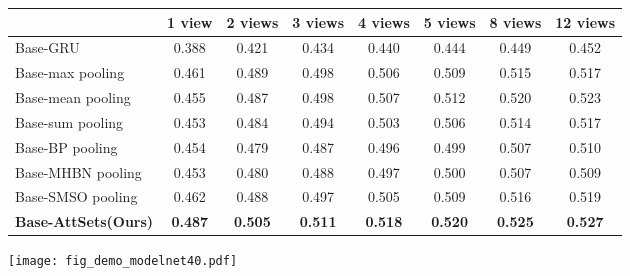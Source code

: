 \documentclass[twocolumn]{svjour3}    \pdfoutput=1
\newcommand{\nickname}{AttSets}
\newcommand{\ie}{\textit{i}.\textit{e}., }
\begin{document}
\begin{table*}[t]
\caption{Group 2: mean IoU for multi-view reconstruction of all 40 categories in ModelNet40 testing split. All networks are firstly trained given only 1 image for each object in Stage 1. The \nickname{} module is further trained given random number of images per object in Stage 2, \ie  is uniformly sampled from \textbf{[1, 12]}, while other competing approaches are fine-tuned given random number of views per object in Stage 2.}
\centering
\label{tab:iou_modelnet_allv}
\tabcolsep=0.4cm
\begin{tabular}{ l|ccccccc}
\hline
&1 view&2 views&3 views& 4 views&5 views&8 views&12 views \\
\hline
Base-GRU &0.388&0.421&0.434&0.440&0.444&0.449&0.452\\
Base-max pooling &0.461&0.489&0.498&0.506&0.509&0.515&0.517\\
Base-mean pooling &0.455&0.487&0.498&0.507&0.512&0.520&0.523\\
Base-sum pooling &0.453&0.484&0.494&0.503&0.506&0.514&0.517\\
Base-BP pooling &0.454&0.479&0.487&0.496&0.499&0.507&0.510\\
Base-MHBN pooling &0.453&0.480&0.488&0.497&0.500&0.507&0.509\\
Base-SMSO pooling &0.462&0.488&0.497&0.505&0.509&0.516&0.519\\
\textbf{Base-\nickname{}(Ours)} &\textbf{0.487}&\textbf{0.505}&\textbf{0.511}&\textbf{0.518}&\textbf{0.520}&\textbf{0.525}
&\textbf{0.527} \\
\hline
\end{tabular}
\vspace{-0.1 cm}
\end{table*}
\begin{figure*}[t]
\centering
   \texttt{[image: fig\_demo\_modelnet40.pdf]}
\caption{Qualitative results of multi-view reconstruction from different approaches in ModelNet40 testing split.}
\label{fig:mv_demo_modelnet40}
\vspace{-0.4cm}
\end{figure*}
\end{document}

